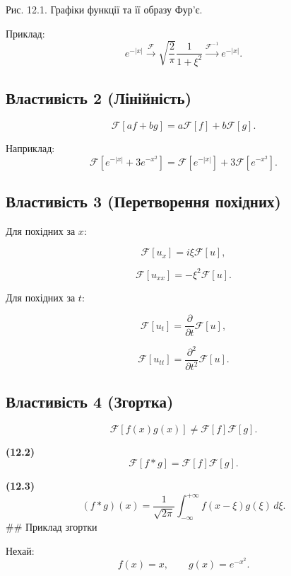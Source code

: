 Рис. 12.1. Графіки функції та її образу Фур'є.

Приклад: \[
e^{-|x|} \xrightarrow{\mathcal{F}} \sqrt{\frac{2}{\pi}}\frac{1}{1+\xi^2} \xrightarrow{\mathcal{F}^{-1}} e^{-|x|}.
\]

\subsection{Властивість 2 (Лінійність)}\label{ux432ux43bux430ux441ux442ux438ux432ux456ux441ux442ux44c-2-ux43bux456ux43dux456ux439ux43dux456ux441ux442ux44c}

\[
\mathcal{F}[af+bg] = a\mathcal{F}[f] + b\mathcal{F}[g].
\]

Наприклад: \[
\mathcal{F}\left[e^{-|x|} + 3e^{-x^2}\right]
= \mathcal{F}\left[e^{-|x|}\right] + 3\mathcal{F}\left[e^{-x^2}\right].
\]

\subsection{Властивість 3 (Перетворення похідних)}\label{ux432ux43bux430ux441ux442ux438ux432ux456ux441ux442ux44c-3-ux43fux435ux440ux435ux442ux432ux43eux440ux435ux43dux43dux44f-ux43fux43eux445ux456ux434ux43dux438ux445}

Для похідних за \(x\):

\[
\mathcal{F}[u_x] = i\xi \mathcal{F}[u],
\]

\[
\mathcal{F}[u_{xx}] = -\xi^2 \mathcal{F}[u].
\]

Для похідних за \(t\):

\[
\mathcal{F}[u_t] = \frac{\partial}{\partial t}\mathcal{F}[u],
\]

\[
\mathcal{F}[u_{tt}] = \frac{\partial^2}{\partial t^2}\mathcal{F}[u].
\]

\subsection{Властивість 4 (Згортка)}\label{ux432ux43bux430ux441ux442ux438ux432ux456ux441ux442ux44c-4-ux437ux433ux43eux440ux442ux43aux430}

\[
\mathcal{F}[f(x)g(x)] \neq \mathcal{F}[f]\mathcal{F}[g].
\]

\textbf{(12.2)} \[
\mathcal{F}[f*g] = \mathcal{F}[f]\mathcal{F}[g].
\]

\textbf{(12.3)} \[
(f*g)(x) = \frac{1}{\sqrt{2\pi}} \int_{-\infty}^{+\infty} f(x-\xi)g(\xi)\,d\xi.
\] \#\# Приклад згортки

Нехай: \[
f(x) = x, \qquad g(x) = e^{-x^2}.
\]

